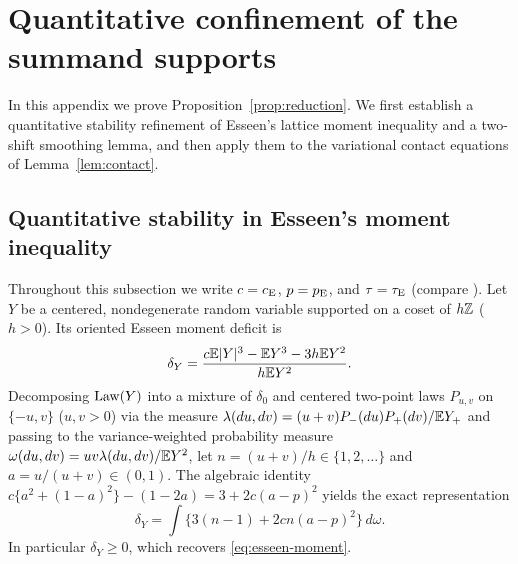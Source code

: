 \section{Quantitative confinement of the summand supports}
\label{app:confinement}

In this appendix we prove Proposition~\ref{prop:reduction}. We first establish
a quantitative stability refinement of Esseen's lattice moment inequality and
a two-shift smoothing lemma, and then apply them to the variational contact
equations of Lemma~\ref{lem:contact}.

\subsection{Quantitative stability in Esseen's moment inequality}

Throughout this subsection we write $c=c_{\mathrm E}$, $p=p_{\mathrm E}$, and $\tau=\tau_{\mathrm E}$
(compare \citet[Lemma~A.9]{HeCheng2026}). Let $Y$ be a centered,
nondegenerate random variable supported on a coset of $h\mathbb Z$ ($h>0$). Its
oriented Esseen moment deficit is
\[
 \delta_Y=\frac{c\mathbb E|Y|^3-\mathbb E Y^3-3h\mathbb E Y^2}{h\mathbb E Y^2}.
\]
Decomposing $\operatorname{Law}(Y)$ into a mixture of $\delta_0$ and centered two-point
laws $P_{u,v}$ on $\{-u,v\}$ ($u,v>0$) via the measure
$\lambda(du,dv)=(u+v)P_-(du)P_+(dv)/\mathbb E Y_+$ and passing to the
variance-weighted probability measure $\omega(du,dv)=uv\lambda(du,dv)/\mathbb E Y^2$,
let $n=(u+v)/h\in\{1,2,\ldots\}$ and $a=u/(u+v)\in(0,1)$. The algebraic
identity $c\{a^2+(1-a)^2\}-(1-2a)=3+2c(a-p)^2$ yields the exact representation
\begin{equation}\label{eq:lattice-deficit}
 \delta_Y=\int\bigl\{3(n-1)+2cn(a-p)^2\bigr\}\,d\omega.
\end{equation}
In particular $\delta_Y\ge0$, which recovers \eqref{eq:esseen-moment}.

